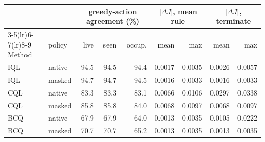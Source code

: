 \begin{tabular}{llrrrrrrr}
\toprule
 & & \multicolumn{3}{c}{greedy-action agreement (\%)} & \multicolumn{2}{c}{$|\Delta J|$, mean rule} & \multicolumn{2}{c}{$|\Delta J|$, terminate} \\
\cmidrule(lr){3-5}\cmidrule(lr){6-7}\cmidrule(lr){8-9}
Method & policy & live & seen & occup. & mean & max & mean & max \\
\midrule
IQL & native & 94.5 & 94.5 & 94.4 & 0.0017 & 0.0035 & 0.0026 & 0.0057 \\
IQL & masked & 94.7 & 94.7 & 94.5 & 0.0016 & 0.0033 & 0.0016 & 0.0033 \\
CQL & native & 83.3 & 83.3 & 83.1 & 0.0066 & 0.0106 & 0.0297 & 0.0338 \\
CQL & masked & 85.8 & 85.8 & 84.0 & 0.0068 & 0.0097 & 0.0068 & 0.0097 \\
BCQ & native & 67.9 & 67.9 & 64.0 & 0.0013 & 0.0035 & 0.0105 & 0.0222 \\
BCQ & masked & 70.7 & 70.7 & 65.2 & 0.0013 & 0.0035 & 0.0013 & 0.0035 \\
\bottomrule
\end{tabular}
